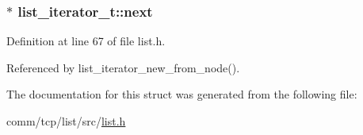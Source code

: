 \subsubsection[{\texorpdfstring{next}{next}}]{$\ast$ list\+\_\+iterator\+\_\+t\+::next}\hypertarget{structlist__iterator__t_adfc911fa0f601936c4a58c95a08737ee}{}\label{structlist__iterator__t_adfc911fa0f601936c4a58c95a08737ee}


Definition at line 67 of file list.\+h.



Referenced by list\+\_\+iterator\+\_\+new\+\_\+from\+\_\+node().



The documentation for this struct was generated from the following file\+:\begin{DoxyCompactItemize}
\item 
comm/tcp/list/src/\hyperlink{list_8h}{list.\+h}\end{DoxyCompactItemize}
